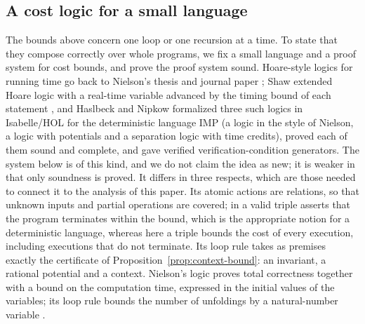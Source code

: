 \documentclass[oneside,english]{amsart}
\numberwithin{equation}{section}
\numberwithin{figure}{section}
\theoremstyle{plain}
\theoremstyle{definition}
\theoremstyle{plain}
\theoremstyle{remark}
\theoremstyle{plain}
\theoremstyle{definition}
\theoremstyle{plain}
\theoremstyle{remark}
\begin{document}
\subsection{A cost logic for a small language}
\label{subsec:cost-logic}

The bounds above concern one loop or one recursion at a time. To state that they compose correctly over whole programs, we fix a small language and a proof system for cost bounds, and prove the proof system sound. Hoare-style logics for running time go back to Nielson's thesis \cite{nielson1984hoare} and journal paper \cite{nielson1987hoare}; Shaw extended Hoare logic with a real-time variable advanced by the timing bound of each statement \cite{shaw1989reasoning}, and Haslbeck and Nipkow \cite{haslbeck2018hoare} formalized three such logics in Isabelle/HOL for the deterministic language IMP (a logic in the style of Nielson, a logic with potentials and a separation logic with time credits), proved each of them sound and complete, and gave verified verification-condition generators. The system below is of this kind, and we do not claim the idea as new; it is weaker in that only soundness is proved. It differs in three respects, which are those needed to connect it to the analysis of this paper. Its atomic actions are relations, so that unknown inputs and partial operations are covered; in \cite{haslbeck2018hoare} a valid triple asserts that the program terminates within the bound, which is the appropriate notion for a deterministic language, whereas here a triple bounds the cost of every execution, including executions that do not terminate. Its loop rule takes as premises exactly the certificate of Proposition~\ref{prop:context-bound}: an invariant, a rational potential and a context. Nielson's logic proves total correctness together with a bound on the computation time, expressed in the initial values of the variables; its loop rule bounds the number of unfoldings by a natural-number variable \cite[rules R-3, R-4]{nielson1987hoare}.
\end{document}
